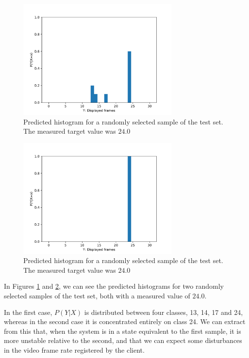 \documentclass[]{article}
\begin{document}
\begin{figure}[h!]
    \centering
    \captionsetup{justification=centering}
    \includegraphics[width=0.72\textwidth,height=\textheight,keepaspectratio]{../result/project1/P(Y|X=x)_2643.pdf}
    \caption{Predicted histogram for a randomly selected sample of the test set. The measured target value was $24.0$}
    \label{fig:2}
\end{figure}

\begin{figure}[h!]
    \centering
    \captionsetup{justification=centering}
    \includegraphics[width=0.72\textwidth,height=\textheight,keepaspectratio]{../result/project1/P(Y|X=x)_7272.pdf}
    \caption{Predicted histogram for a randomly selected sample of the test set. The measured target value was $24.0$}
    \label{fig:3}
\end{figure}

In Figures \ref{fig:2} and \ref{fig:3}, we can see the predicted histograms for two randomly selected samples of the test set, both with a measured value of $24.0$.

In the first case, $P(Y|X)$ is distributed between four classes, 13, 14, 17 and 24, whereas in the second case it is concentrated entirely on class 24. 
We can extract from this that, when the system is in a state equivalent to the first sample, it is more unstable relative to the second, and that we can expect some disturbances in the video frame rate registered by the client.

\printbibliography
\end{document}
